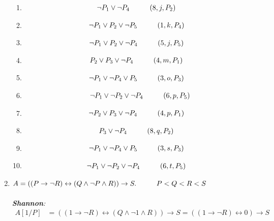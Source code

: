 \documentclass[a4paper,12pt]{article}
\newcommand\tab[1][1cm]{\hspace*{#1}}
\begin{document}
\begin{enumerate}
\begin{multicols}{2}
\begin{enumerate}
			\item \begin{align*}
				\neg P_1\lor\neg P_4\tab & (8,j,P_2)
			\end{align*}
			\item \begin{align*}
				\neg P_1\lor P_2\lor\neg P_5\tab & (1,k,P_4)
			\end{align*}
			\item \begin{align*}
				\neg P_1\lor P_2\lor\neg P_4\tab & (5, j,P_5)
			\end{align*}
			\item \begin{align*}
				P_2\lor P_3\lor\neg P_4\tab & (4,m,P_1)
			\end{align*}
			\item \begin{align*}
				\neg P_1\lor\neg P_4\lor P_5\tab & (3, o,P_3)
			\end{align*}
			\item \begin{align*}
				\neg P_1\lor\neg P_2\lor\neg P_4\tab (6,p,P_5)
			\end{align*}
			\item \begin{align*}
				\neg P_2\lor P_3\lor\neg P_4\tab & (4,p,P_1)
			\end{align*}
			\item \begin{align*}
				P_3\lor\neg P_4\tab & (8,q,P_2)
			\end{align*}
			\item \begin{align*}
				\neg P_1\lor\neg P_4\lor P_5\tab & (3,s,P_3) 
			\end{align*}
			\item \begin{align*}
				\neg P_1\lor\neg P_2\lor\neg P_4\tab & (6,t,P_5) 
			\end{align*}
		\end{enumerate}
	\end{multicols}
	\item $A=((P\to\neg R)\leftrightarrow(Q\land\neg P\land R))\to S.\tab P<Q<R<S$\\\\\emph{\textbf{Shannon}:}\\\begin{align*}
		A[1/P]&=((1\to\neg R)\leftrightarrow(Q\land\neg 1\land R))\to S=((1\to\neg R)\leftrightarrow0)\to S\\

\end{align*}
\end{enumerate}
\end{document}

